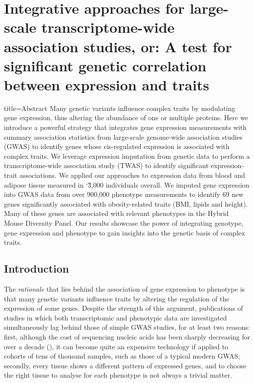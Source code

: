 \documentclass[../main.tex]{subfiles}
\begin{document}
\chapter{Integrative approaches for large-scale transcriptome-wide 
association studies, or: A test for significant \cis genetic correlation 
between expression and traits}

\begin{external_abstract}{title=Abstract}
Many genetic variants influence complex traits by modulating gene 
expression, thus altering the abundance of one or multiple proteins. 
Here we introduce a powerful strategy that integrates gene expression 
measurements with summary association statistics from large-scale 
genome-wide association studies (GWAS) to identify genes whose 
cis-regulated expression is associated with complex traits. We leverage 
expression imputation from genetic data to perform a transcriptome-wide 
association study (TWAS) to identify significant expression-trait 
associations. We applied our approaches to expression data from blood 
and adipose tissue measured in \char`\~3,000 individuals overall. We 
imputed gene expression into GWAS data from over 900,000 phenotype 
measurements to identify 69 new genes significantly associated with 
obesity-related traits (BMI, lipids and height). Many of these genes are 
associated with relevant phenotypes in the Hybrid Mouse Diversity Panel. 
Our results showcase the power of integrating genotype, gene expression 
and phenotype to gain insights into the genetic basis of complex traits.
\end{external_abstract}

\section{Introduction}

The \textit{rationale} that lies behind the association of gene 
expression to phenotype is that many genetic variants influence traits 
by altering the regulation of the expression of some genes. Despite the 
strength of this argument, publications of studies in which both 
transcriptomic and phenotypic data are investigated simultaneously lag 
behind those of simple GWAS studies, for at least two reasons: first, 
although the cost of sequencing nucleic acids has been sharply 
decreasing for over a decade (), it can become 
quite an expensive technology if applied to cohorts of tens of thousand 
samples, such as those of a typical modern GWAS; secondly, every tissue 
shows a different pattern of expressed genes, and to choose the right 
tissue to analyse for each phenotype is not always a trivial 
matter.
\end{document}
